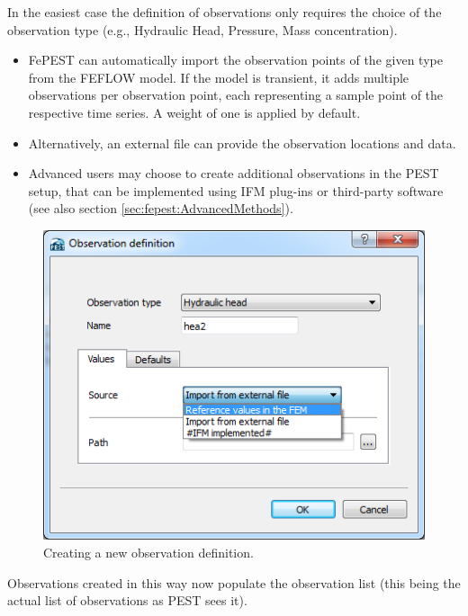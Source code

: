In the easiest case the definition of observations only requires the choice of the observation type (e.g., Hydraulic Head, Pressure, Mass concentration). 

\begin{itemize}
\item FePEST can automatically import the observation points of the given type from the FEFLOW model. If the model is transient, it adds multiple observations per observation point, each representing a sample point of the respective time series. A weight of one is applied by default.

\item Alternatively, an external file can provide the observation locations and data.

\item Advanced users may choose to create additional observations in the PEST setup, that can be implemented using IFM plug-ins or third-party software (see also section \ref{sec:fepest:AdvancedMethods}).

\end{itemize}

\begin{figure}
	\center
	\includegraphics[width=\columnwidth]{figureFundamentalSetup/NewObservationDefinition.png}
\caption{Creating a new observation definition.}
\label{fig:fepest:NewObservationDefinition}
\end{figure}


Observations created in this way now populate the observation list (this being the actual list of observations as PEST sees it).

